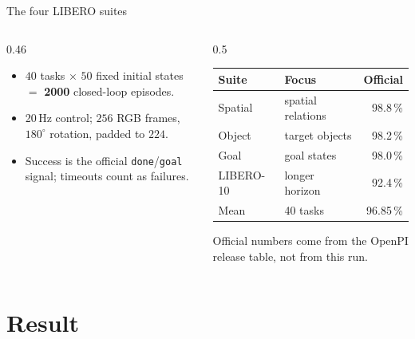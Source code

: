\begin{frame}{The four LIBERO suites}
  \begin{columns}[T]
    \begin{column}{0.46\linewidth}
      \begin{itemize}
        \item $40$ tasks $\times$ $50$ fixed initial states $=$
              \textbf{2000} closed-loop episodes.
        \item 20\,Hz control; $256$ RGB frames, $180^{\circ}$ rotation, padded
              to $224$.
        \item Success is the official \texttt{done}/\texttt{goal} signal;
              timeouts count as failures.
      \end{itemize}
    \end{column}
    \begin{column}{0.5\linewidth}
      \centering
      \vspace{-2mm}
      \begin{tabular}{@{}llr@{}}
        \toprule
        Suite & Focus & Official \\
        \midrule
        Spatial   & spatial relations   & 98.8\,\% \\
        Object    & target objects      & 98.2\,\% \\
        Goal      & goal states         & 98.0\,\% \\
        LIBERO-10 & longer horizon      & 92.4\,\% \\
        \midrule
        Mean      & 40 tasks               & 96.85\,\% \\
        \bottomrule
      \end{tabular}
      \vfill
      {\scriptsize Official numbers come from the OpenPI release table, not
       from this run.}
    \end{column}
  \end{columns}
\end{frame}

\section{Result}

